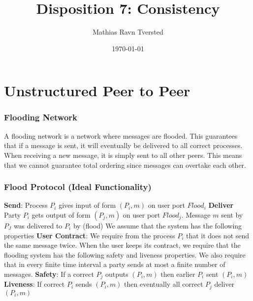 
\newcommand{\N}{\mathbb{N}}

\title{Disposition 7: Consistency}   
\author{Mathias Ravn Tversted} 
\date{\today} 




\frame{\titlepage} 








\section{Unstructured Peer to Peer}
    \begin{frame}
        \frametitle{Flooding Network}
            A flooding network is a network where messages are flooded. This guarantees that if a message is sent, it will eventually be delivered to all correct processes. When receiving a new message, it is simply sent to all other peers. This means that we cannot guarantee total ordering since messages can overtake each other. 
    \end{frame}
    \begin{frame}
        \frametitle{Flood Protocol (Ideal Functionality)}
            \textbf{Send}: Process $P_i$ gives input of form $(P_i, m)$ on user port $Flood_i$
            \textbf{Deliver} Party $P_i$ gets output of form $(P_j, m)$ on user port $Flood_j$. Message $m$ sent by $P_J$ was delivered to $P_i$ by (flood)
            We assume that the system has the following properties
            \textbf{User Contract}: We require from the process $P_i$ that it does not send the same message twice. When the user keeps its contract, we require that the flooding system has the following safety and liveness properties. We also require that in every finite time interval a party sends at most a finite number of messages.
            \textbf{Safety}: If a correct $P_j$ outputs $(P_i, m)$ then earlier $P_i$ sent $(P_i, m)$
            \textbf{Liveness}: If correct $P_i$ sends $(P_i, m)$ then eventually all correct $P_j$ deliver $(P_i, m)$
    \end{frame}

